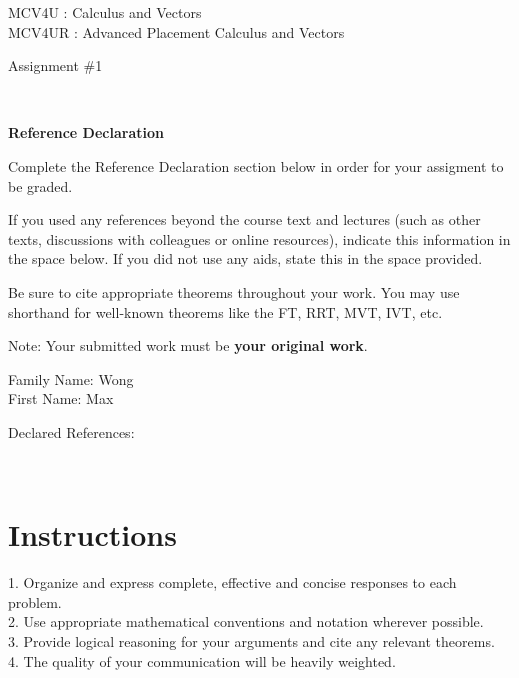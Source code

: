 \documentclass[12pt]{book}
\begin{document}
\vspace{-1.0in}\begin{center}
\Large{MCV4U : Calculus and Vectors}\\
\Large{MCV4UR : Advanced Placement Calculus and Vectors }

\Large{Assignment \#1}


\end{center}


\vspace{0.015in}\hrulefill\ 

\textbf{Reference Declaration} %

Complete the Reference Declaration section below in order for your assigment to be graded.

If you used any references beyond the course text and lectures (such as other texts, discussions with colleagues or online resources), indicate this information in the space below.  If you did not use any aids, state this in the space provided. 

Be sure to cite appropriate theorems throughout your work. You may use shorthand for well-known theorems like the FT, RRT, MVT, IVT, etc. 

Note: Your submitted work must be \textbf{your original work}. 

Family Name: Wong\\%
First Name: Max %

Declared References: 


\vspace{0.015in}\hrulefill\ 

\newpage

\section*{Instructions}

\begin{center}
\setlength{\fboxrule}{2pt}
\begin{boxedminipage}{6.5in}
1.	Organize and express complete, effective and concise responses to each problem.\\
2.	Use appropriate mathematical conventions and notation wherever possible.\\
3.	Provide logical reasoning for your arguments and cite any relevant theorems. \\
4.  The quality of your communication will be heavily weighted.
\end{boxedminipage}
\end{center} 
\end{document}
